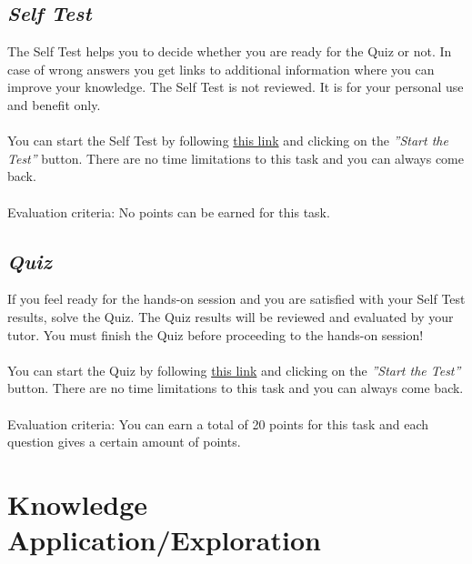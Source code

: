\documentclass[11pt,a4paper]{scrreprt}
\begin{document}
\section{\textit{Self Test}}
The Self Test helps you to decide whether you are ready for the Quiz or not. In case of wrong answers you get links to additional information where you can improve your knowledge. The Self Test is not reviewed. It is for your personal use and benefit only. \\\\
You can start the Self Test by following \href{https://ilias.unibe.ch/ilias.php?baseClass=ilObjTestGUI&ref_id=402563&cmd=infoScreen}{this link} and clicking on the \textit{''Start the Test''} button.
There are no time limitations to this task and you can always come back. \\\\
Evaluation criteria: 
No points can be earned for this task.

\section{\textit{Quiz}}
If you feel ready for the hands-on session and you are satisfied with your Self Test results, solve the Quiz. The Quiz results will be reviewed and evaluated by your tutor.
You must finish the Quiz before proceeding to the hands-on session! \\\\
You can start the Quiz by following \href{https://ilias.unibe.ch/ilias.php?baseClass=ilObjTestGUI&ref_id=402568&cmd=infoScreen}{this link} and clicking on the \textit{''Start the Test''} button.
There are no time limitations to this task and you can always come back. \\\\
Evaluation criteria:
You can earn a total of 20 points for this task and each question gives a certain amount of points.

\chapter{Knowledge Application/Exploration}
\end{document}
